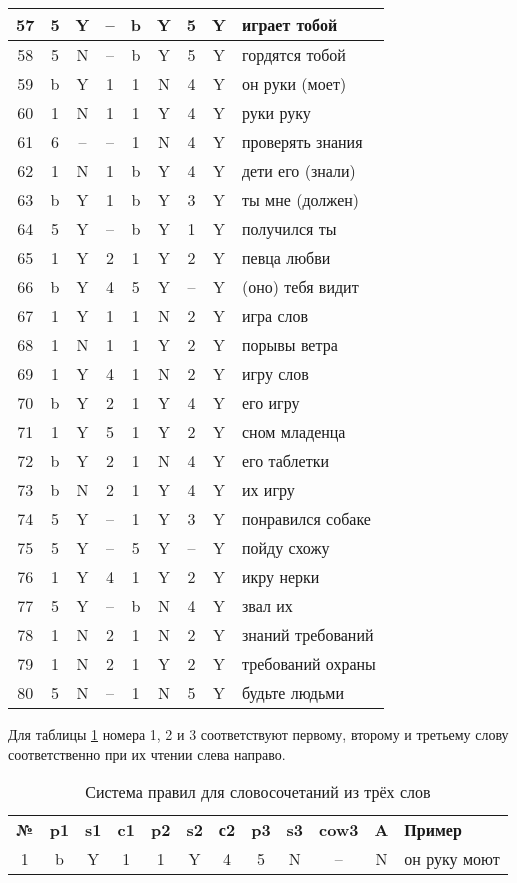\documentclass[main]{subfiles}
\begin{document}
\begin{longtable}[c]{|c|c|c|c|c|c|c|c|p{110px}|}
			57&5&Y&--&b&Y&5&Y&играет тобой\\ \hline
			58&5&N&--&b&Y&5&Y&гордятся тобой\\ \hline
			59&b&Y&1&1&N&4&Y&он руки (моет)\\ \hline
			60&1&N&1&1&Y&4&Y&руки руку \\ \hline
			61&6&--&--&1&N&4&Y&проверять знания\\ \hline
			62&1&N&1&b&Y&4& Y&дети его (знали)\\ \hline
			63&b&Y&1&b&Y&3&Y&ты мне (должен) \\ \hline
			64&5&Y&--&b&Y&1&Y&получился ты\\ \hline
			65&1&Y&2&1&Y&2&Y&певца любви\\ \hline
			66&b&Y&4&5&Y&--&Y&(оно) тебя видит\\ \hline
			67&1&Y&1&1&N&2&Y&игра слов \\ \hline
			68&1&N&1&1&Y&2&Y&порывы ветра\\ \hline
			69&1&Y&4&1&N&2&Y&игру слов\\ \hline
			70&b&Y&2&1&Y&4&Y&его игру\\ \hline
			71&1&Y&5&1&Y&2&Y&сном младенца\\ \hline
			72&b&Y&2&1&N&4&Y&его таблетки\\ \hline
			73&b&N&2&1&Y&4&Y&их игру\\ \hline
			74&5&Y&--&1&Y&3&Y&понравился собаке\\ \hline
			75&5&Y&--&5&Y&--&Y&пойду схожу\\ \hline
			76&1&Y&4&1&Y&2&Y&икру нерки\\ \hline
			77&5&Y&--&b&N&4&Y&звал их\\ \hline
			78&1&N&2&1&N&2&Y&знаний требований\\ \hline
			79&1&N&2&1&Y&2&Y&требований охраны \\ \hline
			80&5&N&--&1&N&5&Y&будьте людьми\\ \hline
\end{longtable}
Для таблицы \ref{tab2} номера 1, 2 и 3 соответствуют первому, второму и третьему слову соответственно при их чтении слева направо.
\begin{longtable}[c]{|c|c|c|c|c|c|c|c|c|c|c|p{120px}|}
	\captionsetup{format=hang,labelsep = endash, singlelinecheck=false}
\caption{Система правил для словосочетаний из трёх слов}\label{tab2}\\
	\hline
	\textbf{№}&\textbf{p1} &\textbf{s1}&\textbf{c1}&\textbf{p2}&\textbf{s2}&\textbf{с2}&\textbf{p3}&\textbf{s3}&\textbf{cow3}&\textbf{A}&\textbf{Пример} \\ \hline
	1 &b  &Y  &1  &1  &Y  &4  &5  &N &--&N&он руку моют \\ \hline
\end{longtable}
\end{document}
